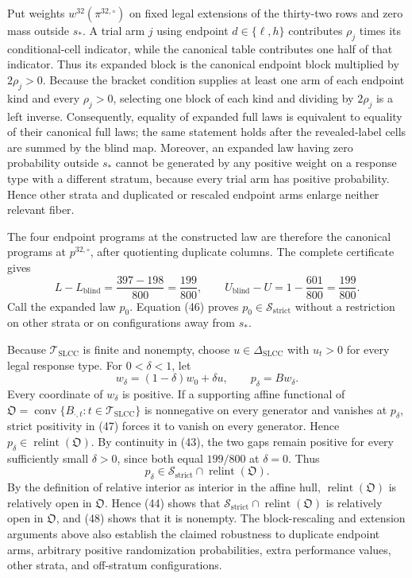 Put weights \(w^{32}(\pi^{32,\circ})\) on fixed legal extensions of the thirty-two rows and zero mass outside \(s_*\).  A trial arm \(j\) using endpoint \(d\in\{\ell,h\}\) contributes \(\rho_j\) times its conditional-cell indicator, while the canonical table contributes one half of that indicator.  Thus its expanded block is the canonical endpoint block multiplied by \(2\rho_j>0\).  Because the bracket condition supplies at least one arm of each endpoint kind and every \(\rho_j>0\), selecting one block of each kind and dividing by \(2\rho_j\) is a left inverse.  Consequently, equality of expanded full laws is equivalent to equality of their canonical full laws; the same statement holds after the revealed-label cells are summed by the blind map.  Moreover, an expanded law having zero probability outside \(s_*\) cannot be generated by any positive weight on a response type with a different stratum, because every trial arm has positive probability.  Hence other strata and duplicated or rescaled endpoint arms enlarge neither relevant fiber.

The four endpoint programs at the constructed law are therefore the canonical programs at \(p^{32,\circ}\), after quotienting duplicate columns.  The complete certificate gives
\[
L-L_{\mathrm{blind}}=\frac{397-198}{800}=\frac{199}{800},
\qquad
U_{\mathrm{blind}}-U=1-\frac{601}{800}=\frac{199}{800}.
\tag{46}
\]
Call the expanded law \(p_0\).  Equation (46) proves \(p_0\in\mathcal S_{\mathrm{strict}}\) without a restriction on other strata or on configurations away from \(s_*\).

Because \(\mathcal T_{\mathrm{SLCC}}\) is finite and nonempty, choose \(u\in\Delta_{\mathrm{SLCC}}\) with \(u_t>0\) for every legal response type.  For \(0<\delta<1\), let
\[
w_\delta=(1-\delta)w_0+\delta u,
\qquad
p_\delta=Bw_\delta.
\tag{47}
\]
Every coordinate of \(w_\delta\) is positive.  If a supporting affine functional of \(\mathfrak O=\operatorname{conv}\{B_{\cdot,t}:t\in\mathcal T_{\mathrm{SLCC}}\}\) is nonnegative on every generator and vanishes at \(p_\delta\), strict positivity in (47) forces it to vanish on every generator.  Hence \(p_\delta\in\operatorname{relint}(\mathfrak O)\).  By continuity in (43), the two gaps remain positive for every sufficiently small \(\delta>0\), since both equal \(199/800\) at \(\delta=0\).  Thus
\[
p_\delta\in\mathcal S_{\mathrm{strict}}\cap\operatorname{relint}(\mathfrak O).
\tag{48}
\]
By the definition of relative interior as interior in the affine hull, \(\operatorname{relint}(\mathfrak O)\) is relatively open in \(\mathfrak O\).  Hence (44) shows that \(\mathcal S_{\mathrm{strict}}\cap\operatorname{relint}(\mathfrak O)\) is relatively open in \(\mathfrak O\), and (48) shows that it is nonempty.  The block-rescaling and extension arguments above also establish the claimed robustness to duplicate endpoint arms, arbitrary positive randomization probabilities, extra performance values, other strata, and off-stratum configurations.